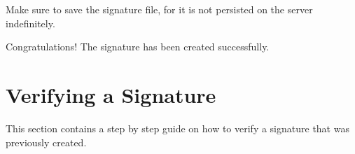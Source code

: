 Make sure to save the signature file,
for it is not persisted on the server indefinitely.

Congratulations!
The signature has been created successfully.





\section{Verifying a Signature}\label{sec:verifying-a-signature}
This section contains a step by step guide on how to verify a signature that was previously created.
